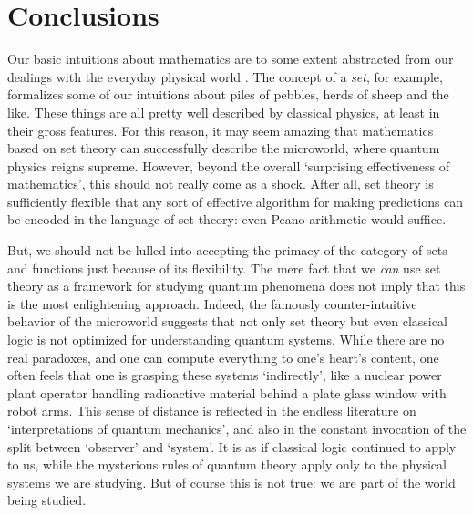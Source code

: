 \documentclass[12pt]{article}
\begin{document}
\section{Conclusions} 
\label{conclusions}

Our basic intuitions about mathematics are to some extent
abstracted from our dealings with the everyday physical 
world \cite{Lakoff}.  The concept of a {\it set}, 
for example, formalizes some of our intuitions about piles of pebbles,
herds of sheep and the like.   These things are all pretty
well described by classical physics, at least in their gross
features.  For this reason, it may seem amazing that mathematics based
on set theory can successfully describe the microworld, where
quantum physics reigns supreme.  However, beyond the overall
`surprising effectiveness of mathematics', this should not really
come as a shock.  After all, set theory is sufficiently flexible
that any sort of effective algorithm for making predictions can be 
encoded in the language of set theory: even Peano arithmetic
would suffice.

But, we should not be lulled into accepting the primacy of the
category of sets and functions just because of its flexibility.
The mere fact that we {\it can} use set theory as a 
framework for studying quantum phenomena does not imply that this is 
the most enlightening approach.  Indeed, the famously counter-intuitive
behavior of the microworld suggests that not only
set theory but even classical logic is not optimized for understanding
quantum systems.   While there are no real paradoxes, and one
can compute everything to one's heart's content, one often feels
that one is grasping these systems `indirectly', like a nuclear 
power plant operator handling radioactive material behind a plate glass 
window with robot arms.  This sense of distance is reflected in
the endless literature on `interpretations of quantum mechanics',
and also in the constant invocation of the split between `observer'
and `system'.  It is as if classical logic continued to apply 
to us, while the mysterious rules of quantum theory apply only 
to the physical systems we are studying.  But of course this is not
true: we are part of the world being studied.  
\end{document}

